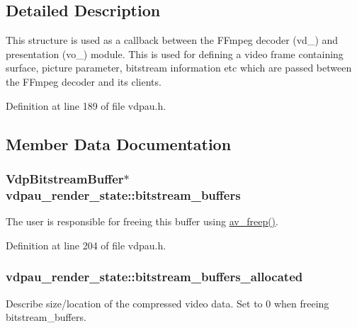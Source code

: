 \subsection{Detailed Description}
This structure is used as a callback between the F\+Fmpeg decoder (vd\+\_\+) and presentation (vo\+\_\+) module. This is used for defining a video frame containing surface, picture parameter, bitstream information etc which are passed between the F\+Fmpeg decoder and its clients. 

Definition at line 189 of file vdpau.\+h.



\subsection{Member Data Documentation}
\subsubsection[{\texorpdfstring{bitstream\+\_\+buffers}{bitstream_buffers}}]{\setlength{\rightskip}{0pt plus 5cm}Vdp\+Bitstream\+Buffer$\ast$ vdpau\+\_\+render\+\_\+state\+::bitstream\+\_\+buffers}\hypertarget{structvdpau__render__state_a5716971d7108b6a94ee628fb4a884e32}{}\label{structvdpau__render__state_a5716971d7108b6a94ee628fb4a884e32}
The user is responsible for freeing this buffer using \hyperlink{group__lavu__mem_ga0cc84043ea2167ad005c86e11d0bcdba}{av\+\_\+freep()}. 

Definition at line 204 of file vdpau.\+h.

\subsubsection[{\texorpdfstring{bitstream\+\_\+buffers\+\_\+allocated}{bitstream_buffers_allocated}}]{ vdpau\+\_\+render\+\_\+state\+::bitstream\+\_\+buffers\+\_\+allocated}\hypertarget{structvdpau__render__state_ab0e6b4e8689307349f7f10e451d57329}{}\label{structvdpau__render__state_ab0e6b4e8689307349f7f10e451d57329}
Describe size/location of the compressed video data. Set to 0 when freeing bitstream\+\_\+buffers. 

